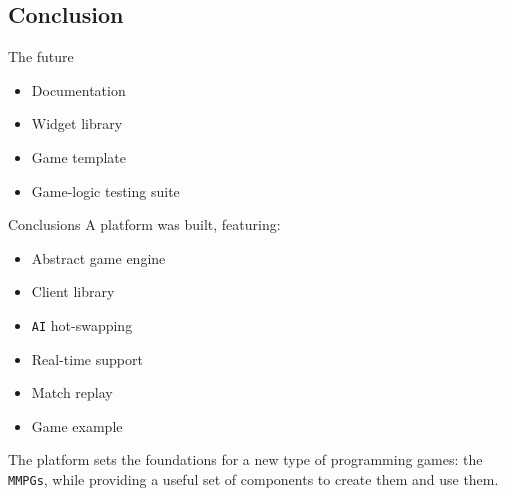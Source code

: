 \documentclass{beamer}
\begin{document}
\subsection{Conclusion}
\begin{frame}{The future}
\begin{itemize}
\item
Documentation
\item
Widget library
\item
Game template
\item
Game-logic testing suite
\end{itemize}
\end{frame}
\begin{frame}{Conclusions}
A platform was built, featuring:
\begin{itemize}
\item
Abstract game engine
\item
Client library
\item
\texttt{AI} hot-swapping
\item
Real-time support
\item
Match replay
\item
Game example
\end{itemize}
The platform sets the foundations for a new type of programming games: the \texttt{MMPGs}, while providing a useful set of
    components to create them and use them.
\end{frame}
\end{document}
